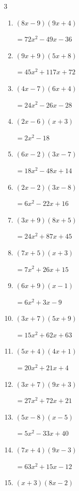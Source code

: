 \begin{multicols}{3}
\begin{enumerate}
        $=42x^{2}-22x-4$

\columnbreak %

  \item $(8x-9)(9x+4)$

        $=72x^{2}-49x-36$

  \item $(9x+9)(5x+8)$

        $=45x^{2}+117x+72$

  \item $(4x-7)(6x+4)$

        $=24x^{2}-26x-28$

  \item $(2x-6)(x+3)$

        $=2x^{2}-18$

  \item $(6x-2)(3x-7)$

        $=18x^{2}-48x+14$

  \item $(2x-2)(3x-8)$

        $=6x^{2}-22x+16$

  \item $(3x+9)(8x+5)$

        $=24x^{2}+87x+45$

  \item $(7x+5)(x+3)$

        $=7x^{2}+26x+15$

  \item $(6x+9)(x-1)$

        $=6x^{2}+3x-9$

  \item $(3x+7)(5x+9)$

        $=15x^{2}+62x+63$

  \item $(5x+4)(4x+1)$

        $=20x^{2}+21x+4$

  \item $(3x+7)(9x+3)$

        $=27x^{2}+72x+21$

  \item $(5x-8)(x-5)$

        $=5x^{2}-33x+40$

  \item $(7x+4)(9x-3)$

        $=63x^{2}+15x-12$

  \item $(x+3)(8x-2)$


\end{enumerate}
\end{multicols}
